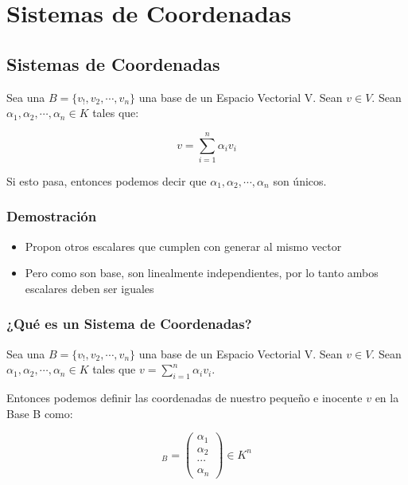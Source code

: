 \documentclass[12pt]{report}							    %
\begin{document}
\chapter{Sistemas de Coordenadas}
    \clearpage

    \section{Sistemas de Coordenadas}

        Sea una $B = \{ v_!, v_2, \cdots, v_n\}$ una base de un Espacio Vectorial V.
        Sean $v \in V$.
        Sean $\alpha_1, \alpha_2, \cdots, \alpha_n \in K$ tales que:

        \begin{equation}
            v = \sum_{i=1}^{n} \alpha_i v_i
        \end{equation}

        Si esto pasa, entonces podemos decir que  $\alpha_1, \alpha_2, \cdots, \alpha_n$ son únicos.

        \subsection{Demostración}
        \begin{itemize}
            \item Propon otros escalares que cumplen con generar al mismo vector
            \item Pero como son base, son linealmente independientes, por lo tanto ambos escalares deben ser iguales
        \end{itemize}


        \subsection{¿Qué es un Sistema de Coordenadas?}
        Sea una $B = \{ v_!, v_2, \cdots, v_n\}$ una base de un Espacio Vectorial V.
        Sean $v \in V$.
        Sean $\alpha_1, \alpha_2, \cdots, \alpha_n \in K$ tales que $v = \sum_{i=1}^{n} \alpha_i v_i$.

        Entonces podemos definir las coordenadas de nuestro pequeño e inocente $v$ en la Base B como:

        \begin{equation}
            [v]_B = 
            \begin{pmatrix} 
                \alpha_1    \\
                \alpha_2    \\
                \cdots      \\
                \alpha_n 
            \end{pmatrix}
            \in K^n
        \end{equation}
\end{document}
